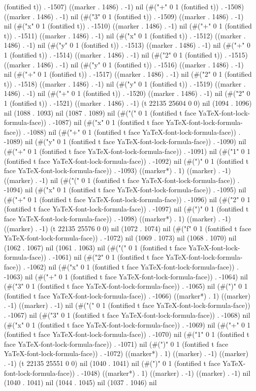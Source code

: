 (fontified t)) . -1507) ((marker . 1486) . -1) nil (#("+" 0 1 (fontified t)) . -1508) ((marker . 1486) . -1) nil (#("3" 0 1 (fontified t)) . -1509) ((marker . 1486) . -1) nil (#("x" 0 1 (fontified t)) . -1510) ((marker . 1486) . -1) nil (#("+" 0 1 (fontified t)) . -1511) ((marker . 1486) . -1) nil (#("x" 0 1 (fontified t)) . -1512) ((marker . 1486) . -1) nil (#("y" 0 1 (fontified t)) . -1513) ((marker . 1486) . -1) nil (#("+" 0 1 (fontified t)) . -1514) ((marker . 1486) . -1) nil (#("2" 0 1 (fontified t)) . -1515) ((marker . 1486) . -1) nil (#("y" 0 1 (fontified t)) . -1516) ((marker . 1486) . -1) nil (#("+" 0 1 (fontified t)) . -1517) ((marker . 1486) . -1) nil (#("2" 0 1 (fontified t)) . -1518) ((marker . 1486) . -1) nil (#("y" 0 1 (fontified t)) . -1519) ((marker . 1486) . -1) nil (#("+" 0 1 (fontified t)) . -1520) ((marker . 1486) . -1) nil (#("2" 0 1 (fontified t)) . -1521) ((marker . 1486) . -1) (t 22135 25604 0 0) nil (1094 . 1096) nil (1088 . 1093) nil (1087 . 1089) nil (#("(" 0 1 (fontified t face YaTeX-font-lock-formula-face)) . -1087) nil (#("x" 0 1 (fontified t face YaTeX-font-lock-formula-face)) . -1088) nil (#("+" 0 1 (fontified t face YaTeX-font-lock-formula-face)) . -1089) nil (#("y" 0 1 (fontified t face YaTeX-font-lock-formula-face)) . -1090) nil (#("+" 0 1 (fontified t face YaTeX-font-lock-formula-face)) . -1091) nil (#("1" 0 1 (fontified t face YaTeX-font-lock-formula-face)) . -1092) nil (#(")" 0 1 (fontified t face YaTeX-font-lock-formula-face)) . -1093) ((marker*) . 1) ((marker) . -1) ((marker) . -1) nil (#("(" 0 1 (fontified t face YaTeX-font-lock-formula-face)) . -1094) nil (#("x" 0 1 (fontified t face YaTeX-font-lock-formula-face)) . -1095) nil (#("+" 0 1 (fontified t face YaTeX-font-lock-formula-face)) . -1096) nil (#("2" 0 1 (fontified t face YaTeX-font-lock-formula-face)) . -1097) nil (#(")" 0 1 (fontified t face YaTeX-font-lock-formula-face)) . -1098) ((marker*) . 1) ((marker) . -1) ((marker) . -1) (t 22135 25576 0 0) nil (1072 . 1074) nil (#("f" 0 1 (fontified t face YaTeX-font-lock-formula-face)) . -1072) nil (1069 . 1073) nil (1068 . 1070) nil (1062 . 1067) nil (1061 . 1063) nil (#("(" 0 1 (fontified t face YaTeX-font-lock-formula-face)) . -1061) nil (#("2" 0 1 (fontified t face YaTeX-font-lock-formula-face)) . -1062) nil (#("x" 0 1 (fontified t face YaTeX-font-lock-formula-face)) . -1063) nil (#("+" 0 1 (fontified t face YaTeX-font-lock-formula-face)) . -1064) nil (#("3" 0 1 (fontified t face YaTeX-font-lock-formula-face)) . -1065) nil (#(")" 0 1 (fontified t face YaTeX-font-lock-formula-face)) . -1066) ((marker*) . 1) ((marker) . -1) ((marker) . -1) nil (#("(" 0 1 (fontified t face YaTeX-font-lock-formula-face)) . -1067) nil (#("3" 0 1 (fontified t face YaTeX-font-lock-formula-face)) . -1068) nil (#("x" 0 1 (fontified t face YaTeX-font-lock-formula-face)) . -1069) nil (#("+" 0 1 (fontified t face YaTeX-font-lock-formula-face)) . -1070) nil (#("1" 0 1 (fontified t face YaTeX-font-lock-formula-face)) . -1071) nil (#(")" 0 1 (fontified t face YaTeX-font-lock-formula-face)) . -1072) ((marker*) . 1) ((marker) . -1) ((marker) . -1) (t 22135 25551 0 0) nil (1040 . 1041) nil (#(")" 0 1 (fontified t face YaTeX-font-lock-formula-face)) . -1048) ((marker*) . 1) ((marker) . -1) ((marker) . -1) nil (1040 . 1041) nil (1044 . 1045) nil (1037 . 1046) nil 